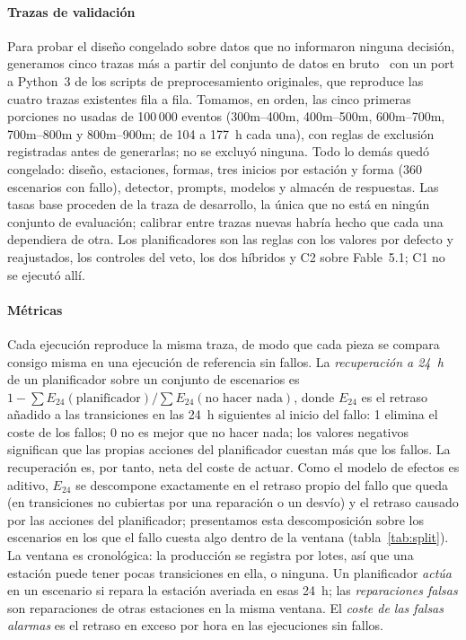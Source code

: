 \documentclass[preprint,11pt]{elsarticle}
\begin{document}
\paragraph{Trazas de validación}
Para probar el diseño congelado sobre datos que no informaron ninguna decisión, generamos cinco trazas más a partir del conjunto de datos en bruto~\cite{bosch2016kaggle} con un port a Python~3 de los scripts de preprocesamiento originales, que reproduce las cuatro trazas existentes fila a fila. Tomamos, en orden, las cinco primeras porciones no usadas de 100\,000 eventos (300m--400m, 400m--500m, 600m--700m, 700m--800m y 800m--900m; de 104 a 177~h cada una), con reglas de exclusión registradas antes de generarlas; no se excluyó ninguna. Todo lo demás quedó congelado: diseño, estaciones, formas, tres inicios por estación y forma (360 escenarios con fallo), detector, prompts, modelos y almacén de respuestas. Las tasas base proceden de la traza de desarrollo, la única que no está en ningún conjunto de evaluación; calibrar entre trazas nuevas habría hecho que cada una dependiera de otra. Los planificadores son las reglas con los valores por defecto y reajustados, los controles del veto, los dos híbridos y C2 sobre Fable~5.1; C1 no se ejecutó allí.

\paragraph{Métricas}
Cada ejecución reproduce la misma traza, de modo que cada pieza se compara consigo misma en una ejecución de referencia sin fallos. La \emph{recuperación a 24~h} de un planificador sobre un conjunto de escenarios es $1-\sum E_{24}(\text{planificador}) / \sum E_{24}(\text{no hacer nada})$, donde $E_{24}$ es el retraso añadido a las transiciones en las 24~h siguientes al inicio del fallo: 1 elimina el coste de los fallos; 0 no es mejor que no hacer nada; los valores negativos significan que las propias acciones del planificador cuestan más que los fallos. La recuperación es, por tanto, neta del coste de actuar. Como el modelo de efectos es aditivo, $E_{24}$ se descompone exactamente en el retraso propio del fallo que queda (en transiciones no cubiertas por una reparación o un desvío) y el retraso causado por las acciones del planificador; presentamos esta descomposición sobre los escenarios en los que el fallo cuesta algo dentro de la ventana (tabla~\ref{tab:split}). La ventana es cronológica: la producción se registra por lotes, así que una estación puede tener pocas transiciones en ella, o ninguna. Un planificador \emph{actúa} en un escenario si repara la estación averiada en esas 24~h; las \emph{reparaciones falsas} son reparaciones de otras estaciones en la misma ventana. El \emph{coste de las falsas alarmas} es el retraso en exceso por hora en las ejecuciones sin fallos.
\end{document}
